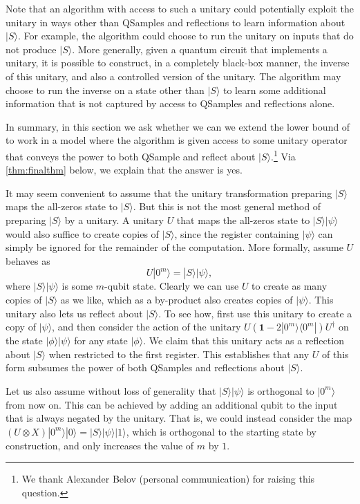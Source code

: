 \documentclass[10pt,a4paper]{article}
\newcommand{\<}{\langle}
\renewcommand{\>}{\rangle}
\newcommand{\id}{\mathbf 1}
\begin{document}
Note that
an algorithm with access to such a unitary could potentially exploit the unitary in ways other
than QSamples and reflections to learn information about $|S\>$. 
For example, the algorithm could choose to run the unitary on inputs that do not produce $|S\>$.
More generally, given a quantum circuit that implements a unitary, it is possible to construct, in a completely black-box manner, the inverse of this unitary, and also a controlled version of the unitary.
The algorithm may choose to run the inverse on a state other than $|S\>$ to learn some additional information that is not captured by access
to QSamples and reflections alone.

In summary, in this section
we ask whether we can we extend the lower bound of  to work in a model where the algorithm is given access to some unitary operator that conveys the power to both QSample and reflect about $|S\>$.\footnote{We thank Alexander Belov (personal communication) for raising this question.} 
Via \cref{thm:finalthm} below, we explain that the answer is yes.


\medskip

It may seem convenient to assume that the unitary
transformation preparing $|S\>$ 
maps the all-zeros state to $|S\>$.
But this is not the most general method of preparing $|S\>$ by a unitary.
A unitary $U$ that maps the all-zeros state to $|S\>|\psi\>$ would also suffice to create copies of $|S\>$, since the register containing $|\psi\>$ can simply be ignored for the remainder of the computation.
More formally, assume $U$ behaves as 
\begin{equation}
    U|0^m\> = |S\>|\psi\>,
\end{equation}
where $|S\>|\psi\>$ is some $m$-qubit state.
Clearly we can use $U$ to create as many copies of $|S\>$ as we like, 
which as a by-product also creates copies of $|\psi\>$.
This unitary also lets us reflect about $|S\>$. 
To see how, first use this unitary to create a copy of $|\psi\>$, and then consider the action of the unitary $U(\id - 2|0^m\>\<0^m|)U^\dagger$ on the state $|\phi\>|\psi\>$ for any state $|\phi\>$. We claim that this unitary acts as a reflection about $|S\>$ when restricted to the first register. 
This establishes that any $U$ of this form subsumes the power of both QSamples and reflections about $|S\>$.

Let us also assume without loss of generality that $|S\>|\psi\>$ is orthogonal to $|0^m\>$ from now on. This can be achieved by adding an additional qubit to the input that is always negated by the unitary. That is, we could instead consider the map $(U \otimes X)|0^m\>|0\> = |S\>|\psi\>|1\>$, which is orthogonal to the starting state by construction, and only increases the value of $m$ by $1$.
\end{document}
